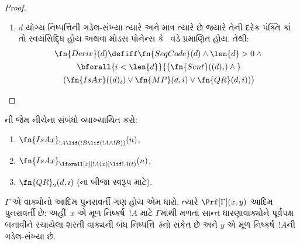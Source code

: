 \begin{proof}
\begin{enumerate}
  \QR{}નું બીજું સ્વરૂપ અભ્યાસપ્રશ્ન
  તરીકે મૂકીએ છીએ.
\item $d$ યોગ્ય નિષ્પત્તિની
  ગડેલ-સંખ્યા ત્યારે અને માત્ર ત્યારે
  છે જ્યારે તેની દરેક પંક્તિ કાં તો
  સ્વયંસિદ્ધિ હોય અથવા મોડસ પોનેન્સ
  કે~\QR{} વડે પ્રમાણિત હોય. તેથી:
  \begin{multline*}
  \fn{Deriv}(d) \defiff \fn{SeqCode}(d) \land \len{d}>0 \land {}\\
  \bforall{i < \len{d}}{\bigl(\fn{Sent}((d)_i) \land {}}\\
  (\fn{IsAx}((d)_i) \lor
    \fn{MP}(d,i) \lor \fn{QR}(d, i))\bigr)
  \end{multline*}
\end{enumerate}
\end{proof}

\begin{prob}
ની
જેમ નીચેના સંબંધો વ્યાખ્યાયિત કરો:
\begin{enumerate}
\item $\fn{IsAx}_{!A \lif (!B \lif (!A \land !B))}(n)$,
\item $\fn{IsAx}_{\lforall[x][!A(x)] \lif !A(t)}(n)$,
\item $\fn{QR}_{2}(d, i)$
  (\QR{}ના બીજા સ્વરૂપ માટે).
\end{enumerate}
\end{prob}

\begin{prop}
$\Gamma$ એ વાક્યોનો આદિમ
પુનરાવર્તી ગણ હોય એમ ધારો.
ત્યારે $\Prf[\Gamma](x, y)$ આદિમ
પુનરાવર્તી છે: અહીં~$x$ એ
મૂળ નિષ્કર્ષ~$!A$ માટે
$\Gamma$માંથી મળતાં સાન્ત
ધારણાવાક્યોને પૂર્વપક્ષ બનાવીને
રચાયેલા શરતી વાક્યની બંધ
નિષ્પત્તિ~$\delta$નો સંકેત છે
અને $y$ એ મૂળ નિષ્કર્ષ~$!A$ની
ગડેલ-સંખ્યા છે.
\end{prop}

